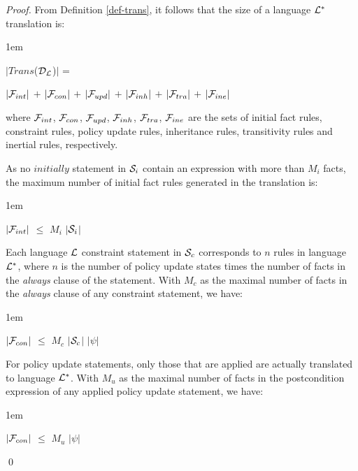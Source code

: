 \documentclass[global,twocolumn,final]{svjour}
\newenvironment{vproof}
  {\begin{proof}\hspace{0.25em}}
  {\qed\end{proof}}
\newenvironment{vquote}
  {\begin{list}{}{\leftmargin 1em}\item[]}
  {\end{list}}
\begin{document}
        \begin{vproof}
          From Definition \ref{def-trans}, it follows that the size of a
          language ${\cal L}^{*}$ translation is:

          \begin{vquote}
            $|$$Trans$(${\cal D_{L}}$)$|$ =

            \hspace{1em}
            $|{\cal F}_{int}|$ $+$
            $|{\cal F}_{con}|$ $+$
            $|{\cal F}_{upd}|$ $+$
            $|{\cal F}_{inh}|$ $+$
            $|{\cal F}_{tra}|$ $+$
            $|{\cal F}_{ine}|$
          \end{vquote}

          where ${\cal F}_{int}$, ${\cal F}_{con}$, ${\cal F}_{upd}$,
          ${\cal F}_{inh}$, ${\cal F}_{tra}$, ${\cal F}_{ine}$ are the sets of
          initial fact rules, constraint rules, policy update rules,
          inheritance rules, transitivity rules and inertial rules,
          respectively.

          As no $initially$ statement in ${\cal S}_{i}$ contain an expression
          with more than $M_{i}$ facts, the maximum number of initial fact
          rules generated in the translation is:

          \begin{vquote}
            $|{\cal F}_{int}|$ $\leq$ $M_{i}$ $|$${\cal S}_{i}$$|$
          \end{vquote}

          Each language ${\cal L}$ constraint statement in ${\cal S}_{c}$
          corresponds to $n$ rules in language ${\cal L}^{*}$, where $n$ is
          the number of policy update states times the number of facts in the
          {\em always} clause of the statement. With $M_{c}$ as the maximal
          number of facts in the {\em always} clause of any constraint
          statement, we have:

          \begin{vquote}
            $|{\cal F}_{con}|$ $\leq$ $M_{c}$ $|$${\cal S}_{c}$$|$ $|\psi|$
          \end{vquote}

          For policy update statements, only those that are applied are
          actually translated to language ${\cal L}^{*}$. With $M_{u}$ as the
          maximal number of facts in the postcondition expression of any
          applied policy update statement, we have:

          \begin{vquote}
            $|{\cal F}_{con}|$ $\leq$ $M_{u}$ $|\psi|$
          \end{vquote}


\end{vproof}
\end{document}
